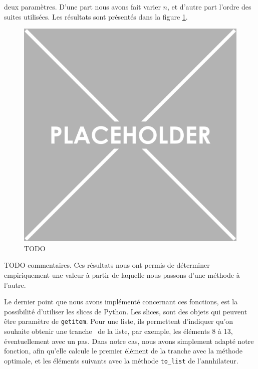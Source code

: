 \documentclass[12pt]{article}
\newlength{\charwidth}
\newcommand{\uline}{\underline{\hspace{2\charwidth}}}
\begin{document}
        deux paramètres. D'une part nous avons fait varier $n$, et d'autre part l'ordre des suites
        utilisées. Les résultats sont présentés dans la figure \ref{fig:getitem}.
        \begin{figure} \begin{center}
            \includegraphics[scale=0.4]{figures/placeholder.png}
            \caption{\label{fig:getitem}\color{red}TODO}
        \end{center} \end{figure}
        {\color{red} TODO commentaires}. Ces résultats nous ont permis de déterminer empiriquement
        une valeur à partir de laquelle nous passons d'une méthode à l'autre.\\
        \par Le dernier point que nous avons implémenté concernant ces fonctions,
        est la possibilité d'utiliser les slices de Python. Les slices, sont des objets
        qui peuvent être paramètre de \texttt{\uline getitem\uline}. Pour une liste, ils permettent
        d'indiquer qu'on souhaite obtenir une \og tranche \fg\ de la liste, par exemple, les éléments
        8 à 13, éventuellement avec un pas. Dans notre cas, nous avons simplement adapté notre
        fonction, afin qu'elle calcule le premier élément de la tranche avec la méthode optimale,
        et les éléments suivants avec la méthode \texttt{to\_list} de l'annhilateur.
\end{document}
